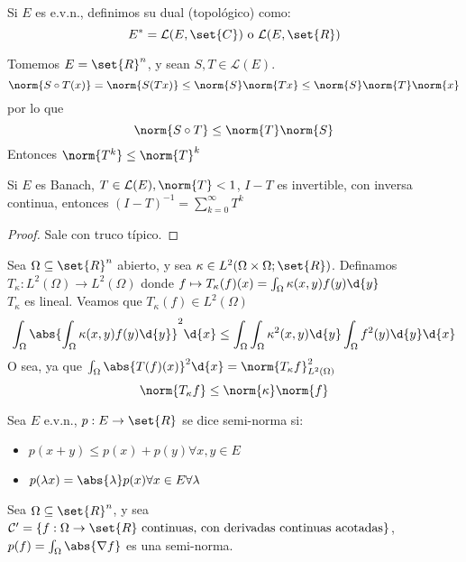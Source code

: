 \documentclass{notetaking}
\begin{document}
\begin{defn}[Dual]
    Si \(E\) es e.v.n., definimos su dual (topológico) como:
    \[
        E^*=\mathcal{L}(E,\set{C})\text{ o }\mathcal{L}(E,\set{R})
    \]
\end{defn}

\begin{ejm}
    Tomemos \(E=\set{R}^n\), y sean \(S,T\in\mathcal{L}(E)\).
    \[
        \norm{S\circ T(x)}=\norm{S(Tx)}\leq\norm{S}\norm{Tx}\leq\norm{S}\norm{T}\norm{x}
    \]
    por lo que
    \[
        \norm{S\circ T}\leq\norm{T}\norm{S}
    \]
    Entonces \(\norm{T^k}\leq\norm{T}^k\)
\end{ejm}
\begin{prp}
    Si \(E\) es Banach, \(T\in\mathcal{L}(E),\norm{T}<1\), \(I-T\) es invertible, con inversa continua, entonces \((I-T)^{-1}=\sum_{k=0}^\infty T^k\)
\end{prp}
\begin{proof}
    Sale con truco típico.
\end{proof}

\begin{ejm}
    Sea \(\Omega\subseteq\set{R}^n\) abierto, y sea \(\kappa\in L^2(\Omega\times\Omega;\set{R})\). Definamos \(T_\kappa:L^2(\Omega)\rightarrow L^2(\Omega)\) donde \(f\mapsto T_\kappa(f)(x)=\int_\Omega \kappa(x,y)f(y)\d{y}\)\\
    \(T_\kappa\) es lineal. Veamos que \(T_\kappa(f)\in L^2(\Omega)\)
    \[
        \int_\Omega\abs{\int_\Omega\kappa(x,y)f(y)\d{y}}^2\d{x}\leq\int_\Omega\int_\Omega\kappa^2(x,y)\d{y}\int_\Omega f^2(y)\d{y}\d{x}
    \]
    O sea, ya que \(\int_\Omega\abs{T(f)(x)}^2\d{x}=\norm{T_\kappa f}^2_{L^2(\Omega)}\)
    \[
        \norm{T_\kappa f}\leq\norm{\kappa}\norm{f}
    \]
\end{ejm}

\begin{defn}
    Sea \(E\) e.v.n., \(p:E\rightarrow\set{R}\) se dice semi-norma si:
    \begin{itemize}
        \item \(p(x+y)\leq p(x)+p(y)\forall x,y\in E\)
        \item \(p(\lambda x)=\abs{\lambda}p(x)\forall x\in E\forall \lambda\)
    \end{itemize}
\end{defn}

\begin{ejm}
    Sea \(\Omega\subseteq\set{R}^n\), y sea \(\mathcal{C}'=\{f:\Omega\rightarrow\set{R}\text{ continuas, con derivadas continuas acotadas}\}\), \(p(f)=\int_\Omega\abs{\nabla f}\) es una semi-norma.
\end{ejm}
\end{document}
